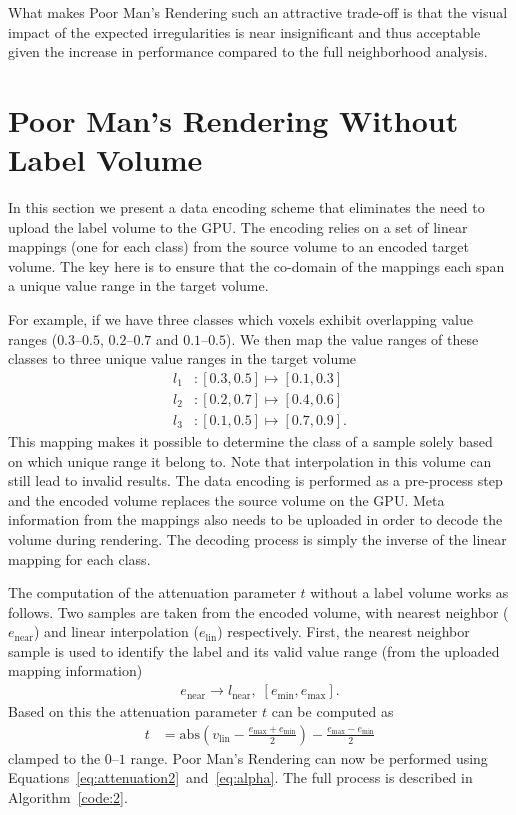 \documentclass{egpubl}
\begin{document}
What makes Poor Man's Rendering such an attractive trade-off is that the visual impact of the expected irregularities is near insignificant and thus acceptable given the increase in performance compared to the full neighborhood analysis.


\section{Poor Man's Rendering Without Label Volume}

In this section we present a data encoding scheme that eliminates the need to upload the label volume to the GPU. The encoding relies on a set of linear mappings (one for each class) from the source volume to an encoded target volume. The key here is to ensure that the co-domain of the mappings each span a unique value range in the target volume. 

For example, if we have three classes which voxels exhibit overlapping value ranges ($0.3$--$0.5$, $0.2$--$0.7$ and $0.1$--$0.5$). We then map the value ranges of these classes to three unique value ranges in the target volume
\begin{align}
l_1&: [0.3,0.5] \mapsto [0.1,0.3] \nonumber\\
l_2&: [0.2,0.7] \mapsto [0.4,0.6] \nonumber\\
l_3&: [0.1,0.5] \mapsto [0.7,0.9] \nonumber  .
\end{align}
This mapping makes it possible to determine the class of a sample solely based on which unique range it belong to. Note that interpolation in this volume can still lead to invalid results. The data encoding is performed as a pre-process step and the encoded volume replaces the source volume on the GPU. Meta information from the mappings also needs to be uploaded in order to decode the volume during rendering. The decoding process is simply the inverse of the linear mapping for each class. 

The computation of the attenuation parameter $t$ without a label volume works as follows. Two samples are taken from the encoded volume, with nearest neighbor ($e_\mathrm{near}$) and linear interpolation ($e_\mathrm{lin}$) respectively. First, the nearest neighbor sample is used to identify the label and its valid value range (from the uploaded mapping information)
\begin{align}
e_\mathrm{near} \rightarrow l_\mathrm{near},\; [e_\mathrm{min}, e_\mathrm{max}]  .
\end{align}
Based on this the attenuation parameter $t$ can be computed as 
\begin{align}
t &= \mathrm{abs}(v_\mathrm{lin} - \frac{e_\mathrm{max} + e_\mathrm{min}}{2}) - \frac{e_\mathrm{max} - e_\mathrm{min}}{2}  \label{eq:attenuation2}
\end{align}
clamped to the $0$--$1$ range. Poor Man's Rendering can now be performed using Equations~\ref{eq:attenuation2}~and~\ref{eq:alpha}. The full process is described in Algorithm~\ref{code:2}.
\end{document}
